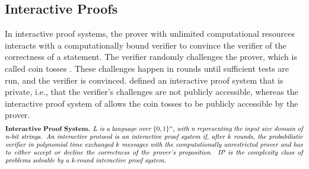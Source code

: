 \subsection{Interactive Proofs}
In interactive proof systems, the prover with unlimited computational resources interacts with a computationally bound verifier to convince the verifier of the correctness of a statement. The verifier randomly challenges the prover, which is called coin tosses \citep{GoldwasserCoinTosses}. These challenges happen in rounds until sufficient tests are run, and the verifier is convinced. \citet{GoldwasserIPs} defined an interactive proof system that is private, i.e., that the verifier's challenges are not publicly accessible, whereas the interactive proof system of \citet{BabaiIPs} allows the coin tosses to be publicly accessible by the prover.
\begin{align*}
    \text{\parbox{450pt}{\textbf{Interactive Proof System.} \textit{\(L\) is a language over \(\{0,1\}^n\), with n representing the input size domain of n-bit strings. An interactive protocol is an interactive proof system if, after \(k\) rounds, the probabilistic verifier in polynomial time exchanged \(k\) messages with the computationally unrestricted prover and has to either accept or decline the correctness of the prover's proposition. IP is the complexity class of problems solvable by a k-round interactive proof system.}}}
\end{align*}
